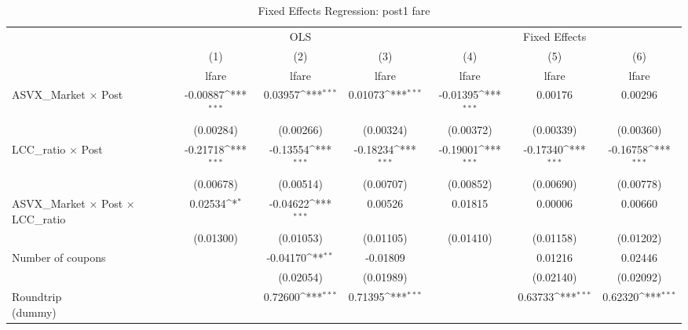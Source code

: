 \begin{table}[htbp]\centering
\def\sym#1{\ifmmode^{#1}\else\(^{#1}\)\fi}
\caption{Fixed Effects Regression: post1 fare}
\begin{tabular}{l*{6}{c}}
\toprule
                    &\multicolumn{3}{c}{OLS}                                          &\multicolumn{3}{c}{Fixed Effects}                                \\\cmidrule(lr){2-4}\cmidrule(lr){5-7}
                    &\multicolumn{1}{c}{(1)}&\multicolumn{1}{c}{(2)}&\multicolumn{1}{c}{(3)}&\multicolumn{1}{c}{(4)}&\multicolumn{1}{c}{(5)}&\multicolumn{1}{c}{(6)}\\
                    &\multicolumn{1}{c}{lfare}&\multicolumn{1}{c}{lfare}&\multicolumn{1}{c}{lfare}&\multicolumn{1}{c}{lfare}&\multicolumn{1}{c}{lfare}&\multicolumn{1}{c}{lfare}\\
\midrule
ASVX\_Market $\times$ Post&    -0.00887\sym{***}&     0.03957\sym{***}&     0.01073\sym{***}&    -0.01395\sym{***}&     0.00176         &     0.00296         \\
                    &   (0.00284)         &   (0.00266)         &   (0.00324)         &   (0.00372)         &   (0.00339)         &   (0.00360)         \\
\addlinespace
LCC\_ratio $\times$ Post&    -0.21718\sym{***}&    -0.13554\sym{***}&    -0.18234\sym{***}&    -0.19001\sym{***}&    -0.17340\sym{***}&    -0.16758\sym{***}\\
                    &   (0.00678)         &   (0.00514)         &   (0.00707)         &   (0.00852)         &   (0.00690)         &   (0.00778)         \\
\addlinespace
ASVX\_Market $\times$ Post $\times$ LCC\_ratio&     0.02534\sym{*}  &    -0.04622\sym{***}&     0.00526         &     0.01815         &     0.00006         &     0.00660         \\
                    &   (0.01300)         &   (0.01053)         &   (0.01105)         &   (0.01410)         &   (0.01158)         &   (0.01202)         \\
\addlinespace
Number of coupons   &                     &    -0.04170\sym{**} &    -0.01809         &                     &     0.01216         &     0.02446         \\
                    &                     &   (0.02054)         &   (0.01989)         &                     &   (0.02140)         &   (0.02092)         \\
\addlinespace
\shortstack{Roundtrip \\ (dummy)}&                     &     0.72600\sym{***}&     0.71395\sym{***}&                     &     0.63733\sym{***}&     0.62320\sym{***}\\

\end{tabular}
\end{table}
